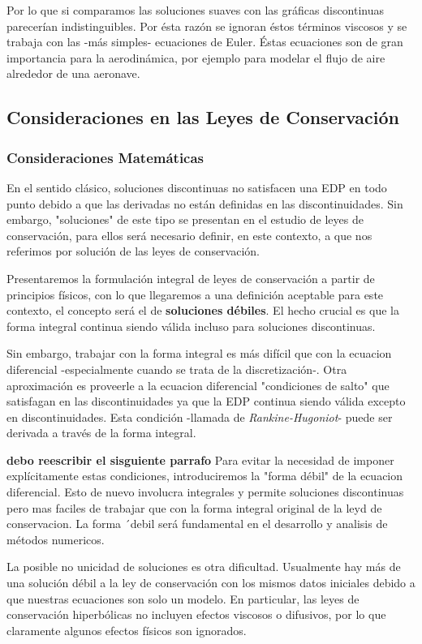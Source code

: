 Por lo que si comparamos las soluciones suaves con las gráficas discontinuas parecerían indistinguibles. Por ésta razón se ignoran éstos términos viscosos y se trabaja con las -más simples- ecuaciones de Euler. Éstas ecuaciones son de gran importancia para la aerodinámica, por ejemplo para modelar el flujo de aire alrededor de una aeronave. 


\subsection{Consideraciones en las Leyes de Conservación}

\subsubsection*{Consideraciones Matemáticas}
En el sentido clásico, soluciones discontinuas  no satisfacen una EDP en todo punto debido a que las derivadas no están definidas en las discontinuidades. Sin embargo, "soluciones" de este tipo se presentan en el estudio de leyes de conservación, para ellos será necesario definir, en este contexto, a que nos referimos por solución de las leyes de conservación.

Presentaremos la formulación integral de leyes de conservación a partir de principios físicos, con lo que llegaremos a una definición aceptable para este contexto, el concepto será el de \textbf{soluciones débiles}. El hecho crucial es que la forma integral continua siendo válida incluso para soluciones discontinuas.

Sin embargo, trabajar con la forma integral es más difícil que con la ecuacion diferencial -especialmente cuando se trata de la discretización-. Otra aproximación es proveerle a la ecuacion diferencial "condiciones de salto" que satisfagan en las discontinuidades ya que la EDP continua siendo válida excepto en discontinuidades. Esta condición -llamada de \textit{Rankine-Hugoniot}- puede ser derivada a través de la forma integral.


\textbf{debo reescribir el sisguiente parrafo}
Para evitar la necesidad de imponer explícitamente estas condiciones, introduciremos la "forma débil" de la ecuacion diferencial. Esto de nuevo involucra integrales y permite soluciones discontinuas pero mas faciles de trabajar que con la forma integral original de la leyd de conservacion. La forma ´debil será fundamental en el desarrollo y analisis de métodos numericos.


La posible no unicidad de soluciones es otra dificultad. Usualmente hay más de una solución débil a la ley de conservación con los mismos datos iniciales debido a que nuestras ecuaciones son solo un modelo. En particular, las leyes de conservación hiperbólicas no incluyen efectos viscosos o difusivos, por lo que claramente algunos efectos físicos son ignorados.

